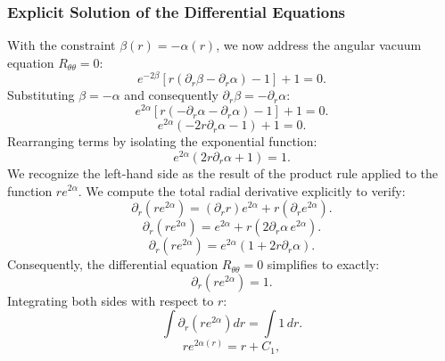 \documentclass[11pt, a4paper]{report}
\begin{document}
\subsubsection{Explicit Solution of the Differential Equations}
With the constraint $\beta(r) = -\alpha(r)$, we now address the angular vacuum equation $R_{\theta\theta} = 0$:
\begin{equation}
e^{-2\beta} \left[ r(\partial_r\beta - \partial_r\alpha) - 1 \right] + 1 = 0.
\end{equation}
Substituting $\beta = -\alpha$ and consequently $\partial_r\beta = -\partial_r\alpha$:
\begin{equation}
e^{2\alpha} \left[ r(-\partial_r\alpha - \partial_r\alpha) - 1 \right] + 1 = 0.
\end{equation}
\begin{equation}
e^{2\alpha} \left( -2r\partial_r\alpha - 1 \right) + 1 = 0.
\end{equation}
Rearranging terms by isolating the exponential function:
\begin{equation}
e^{2\alpha} \left( 2r\partial_r\alpha + 1 \right) = 1.
\end{equation}
We recognize the left-hand side as the result of the product rule applied to the function $r e^{2\alpha}$. We compute the total radial derivative explicitly to verify:
\begin{equation}
\partial_r \left( r e^{2\alpha} \right) = \left( \partial_r r \right) e^{2\alpha} + r \left( \partial_r e^{2\alpha} \right).
\end{equation}
\begin{equation}
\partial_r \left( r e^{2\alpha} \right) = e^{2\alpha} + r \left( 2\partial_r\alpha \, e^{2\alpha} \right).
\end{equation}
\begin{equation}
\partial_r \left( r e^{2\alpha} \right) = e^{2\alpha} \left( 1 + 2r\partial_r\alpha \right).
\end{equation}
Consequently, the differential equation $R_{\theta\theta} = 0$ simplifies to exactly:
\begin{equation}
\partial_r \left( r e^{2\alpha} \right) = 1.
\end{equation}
Integrating both sides with respect to $r$:
\begin{equation}
\int \partial_r \left( r e^{2\alpha} \right) dr = \int 1 \, dr.
\end{equation}
\begin{equation}
r e^{2\alpha(r)} = r + C_1,
\end{equation}
\end{document}
